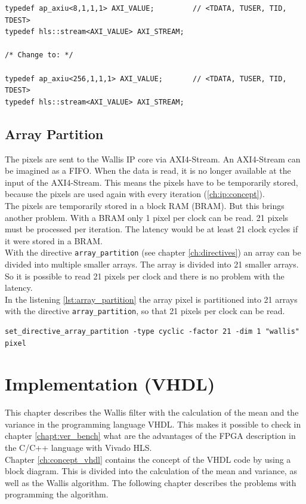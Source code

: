 \begin{minipage}{\textwidth}
\begin{lstlisting}[style=CStyle, caption=Calculation of the division for the Wallis filter, label=lst:division]
typedef ap_axiu<8,1,1,1> AXI_VALUE;			// <TDATA, TUSER, TID, TDEST>
typedef hls::stream<AXI_VALUE> AXI_STREAM;

/* Change to: */

typedef ap_axiu<256,1,1,1> AXI_VALUE;		// <TDATA, TUSER, TID, TDEST>
typedef hls::stream<AXI_VALUE> AXI_STREAM;
\end{lstlisting}
\end{minipage}

\subsection{Array Partition}
The pixels are sent to the Wallis IP core via AXI4-Stream. An AXI4-Stream can be imagined as a FIFO. When the data is read, it is no longer available at the input of the AXI4-Stream. This means the pixels have to be temporarily stored, because the pixels are used again with every iteration (\ref{ch:ip:concept}). \\
The pixels are temporarily stored in a block RAM (BRAM). But this brings another problem. With a BRAM only 1 pixel per clock can be read. 21 pixels must be processed per iteration. The latency would be at least 21 clock cycles if it were stored in a BRAM. \\
With the directive \texttt{array\_partition} (see chapter \ref{ch:directives})
an array can be divided into multiple smaller arrays. The array is divided into 21 smaller arrays. So it is possible to read 21 pixels per clock and there is no problem with the latency. \\
In the listening \ref{lst:array_partition} the array pixel is partitioned into 21 arrays with the directive \texttt{array\_partition}, so that 21 pixels per clock can be read. 
\begin{minipage}{\textwidth}
\begin{lstlisting}[style=TextStyle, caption=Set directive array\_partition, label=lst:array_partition]
set_directive_array_partition -type cyclic -factor 21 -dim 1 "wallis" pixel
\end{lstlisting}
\end{minipage}



\section{Implementation (VHDL)} \label{ch:ip:imp_vhdl}
This chapter describes the Wallis filter with the calculation of the mean and the variance in the programming language VHDL. This makes it possible to check in chapter \ref{chapt:ver_bench} what are the advantages of the FPGA description in the C/C++ language with Vivado HLS. \\
Chapter \ref{ch:concept_vhdl} contains the concept of the VHDL code by using a block diagram. This is divided into the calculation of the mean and variance, as well as the Wallis algorithm. The following chapter describes the problems with programming the algorithm.

